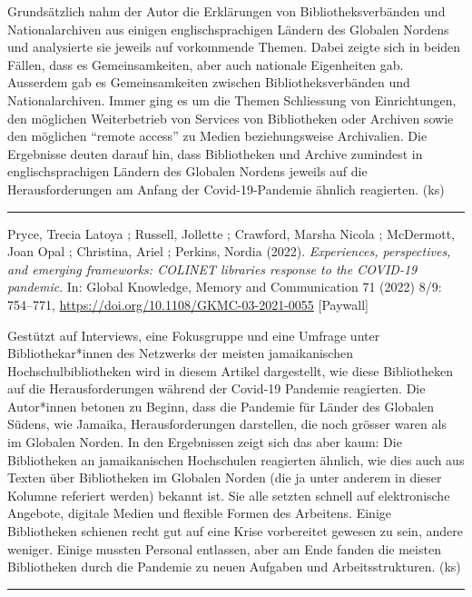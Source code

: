 \documentclass[a4paper,
fontsize=11pt,
oneside,
numbers=noperiodatend,
parskip=half-,
bibliography=totoc,
final
]{scrartcl}
\begin{document}
Grundsätzlich nahm der Autor die Erklärungen von Bibliotheksverbänden
und Nationalarchiven aus einigen englischsprachigen Ländern des Globalen
Nordens und analysierte sie jeweils auf vorkommende Themen. Dabei zeigte
sich in beiden Fällen, dass es Gemeinsamkeiten, aber auch nationale
Eigenheiten gab. Ausserdem gab es Gemeinsamkeiten zwischen
Bibliotheksverbänden und Nationalarchiven. Immer ging es um die Themen
Schliessung von Einrichtungen, den möglichen Weiterbetrieb von Services
von Bibliotheken oder Archiven sowie den möglichen \enquote{remote
access} zu Medien beziehungsweise Archivalien. Die Ergebnisse deuten
darauf hin, dass Bibliotheken und Archive zumindest in
englischsprachigen Ländern des Globalen Nordens jeweils auf die
Herausforderungen am Anfang der Covid-19-Pandemie ähnlich reagierten.
(ks)

\begin{center}\rule{0.5\linewidth}{0.5pt}\end{center}

Pryce, Trecia Latoya ; Russell, Jollette ; Crawford, Marsha Nicola ;
McDermott, Joan Opal ; Christina, Ariel ; Perkins, Nordia (2022).
\emph{Experiences, perspectives, and emerging frameworks: COLINET
libraries response to the COVID-19 pandemic}. In: Global Knowledge,
Memory and Communication 71 (2022) 8/9: 754--771,
\url{https://doi.org/10.1108/GKMC-03-2021-0055} {[}Paywall{]}

Gestützt auf Interviews, eine Fokusgruppe und eine Umfrage unter
Bibliothekar*innen des Netzwerks der meisten jamaikanischen
Hochschulbibliotheken wird in diesem Artikel dargestellt, wie diese
Bibliotheken auf die Herausforderungen während der Covid-19 Pandemie
reagierten. Die Autor*innen betonen zu Beginn, dass die Pandemie für
Länder des Globalen Südens, wie Jamaika, Herausforderungen darstellen,
die noch grösser waren als im Globalen Norden. In den Ergebnissen zeigt
sich das aber kaum: Die Bibliotheken an jamaikanischen Hochschulen
reagierten ähnlich, wie dies auch aus Texten über Bibliotheken im
Globalen Norden (die ja unter anderem in dieser Kolumne referiert
werden) bekannt ist. Sie alle setzten schnell auf elektronische
Angebote, digitale Medien und flexible Formen des Arbeitens. Einige
Bibliotheken schienen recht gut auf eine Krise vorbereitet gewesen zu
sein, andere weniger. Einige mussten Personal entlassen, aber am Ende
fanden die meisten Bibliotheken durch die Pandemie zu neuen Aufgaben und
Arbeitsstrukturen. (ks)

\begin{center}\rule{0.5\linewidth}{0.5pt}\end{center}
\end{document}
